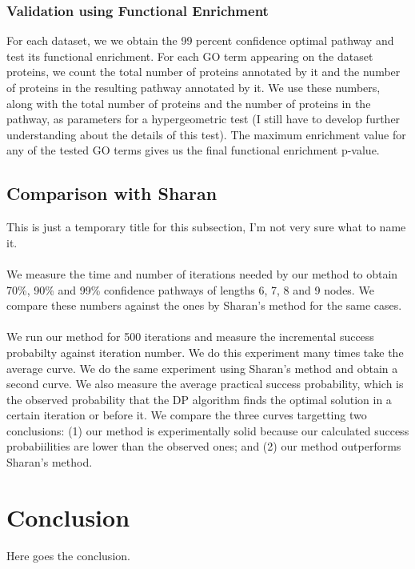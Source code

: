 \documentclass{ws-procs11x85}
\begin{document}
\subsubsection{Validation using Functional Enrichment}
 For each dataset, we we obtain the 99 percent confidence optimal pathway and
 test its functional enrichment. For each GO term appearing on the dataset
 proteins, we count the total number of proteins annotated by it and the
 number of proteins in the resulting pathway annotated by it. We use these
 numbers, along with the total number of proteins and the number of proteins in
 the pathway, as parameters for a hypergeometric test (I still have to develop
 further understanding about the details of this test). The maximum enrichment
 value for any of the tested GO terms gives us the final functional enrichment
 p-value.

\subsection{Comparison with Sharan}
This is just a temporary title for this subsection, I'm not very sure what to
name it.

\paragraph{}
We measure the time and number of iterations needed by our method to obtain
70\%, 90\% and 99\% confidence pathways of lengths 6, 7, 8 and 9 nodes. We
compare these numbers against the ones by Sharan's method for the same cases.

\paragraph{}
We run our method for 500 iterations and measure the incremental success
probabilty against iteration number. We do this experiment many times take the
average curve. We do the same experiment using Sharan's method and obtain a
second curve. We also measure the average practical success probability, which
is the observed probability that the DP algorithm finds the optimal solution in
a certain iteration or before it. We compare the three curves targetting two
conclusions: (1) our method is experimentally solid because our calculated
success probabiilities are lower than the observed ones; and (2) our method
outperforms Sharan's method.

\section{Conclusion}
Here goes the conclusion.




\end{document}
